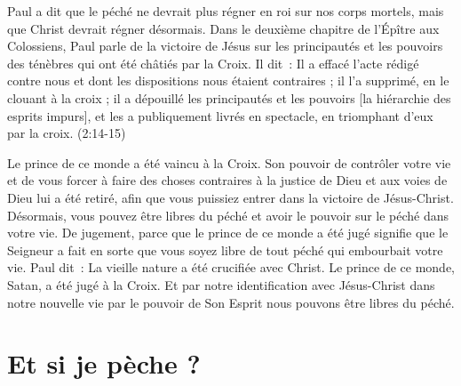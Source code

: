 Paul a dit que le péché ne devrait plus régner en roi sur nos corps mortels,
 mais que Christ devrait régner désormais.
 Dans le deuxième chapitre de l'Épître aux Colossiens,
 Paul parle de la victoire de Jésus sur les principautés et les pouvoirs
 des ténèbres qui ont été châtiés par la Croix. Il dit~:
 \Og Il a effacé l'acte rédigé contre nous et dont les dispositions
 nous étaient contraires ; il l'a supprimé, en le clouant à la croix ;
 il a dépouillé les principautés et les pouvoirs
 [la hiérarchie des esprits impurs],
 et les a publiquement livrés en spectacle, en triomphant d'eux
 par la croix.  \Fg{} (2:14-15)

Le prince de ce monde a été vaincu à la Croix.
 Son pouvoir de contrôler votre vie et de vous forcer à faire des choses
 contraires à la justice de Dieu et aux voies de Dieu lui a été retiré,
 afin que vous puissiez entrer dans la victoire de Jésus-Christ.
 Désormais, vous pouvez être libres du péché et avoir le pouvoir
 sur le péché dans votre vie.
 \Og De jugement, parce que le prince de ce monde a été jugé \Fg{}
 signifie que le Seigneur a fait en sorte que vous soyez libre de tout péché
 qui embourbait votre vie. Paul dit~:
 \Og La vieille nature a été crucifiée avec Christ. \Fg{}
 Le prince de ce monde, Satan, a été jugé à la Croix.
 Et par notre identification avec Jésus-Christ dans notre nouvelle vie
 \ocadr par le pouvoir de Son Esprit \fcadr{}
 nous pouvons être libres du péché.

\section{Et si je p\`eche ?}

